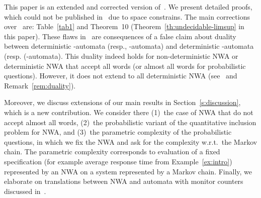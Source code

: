 \documentclass{lmcs}
\begin{document}
\noindent
This paper is an extended and corrected version of~\cite{conferenceVersion,DBLP:conf/sas/ChatterjeeHO16}. We present detailed proofs, which
could not be published in~\cite{conferenceVersion} due to space constrains.
The main corrections over~\cite{conferenceVersion} are: Table~\ref{tab1} and
Theorem~10 (Theorem~\ref{th:undecidable-limsup} in this paper).
These flaws in~\cite{conferenceVersion} are consequences of a false claim about duality
between deterministic -automata (resp., -automata) and deterministic
 -automata (resp. (-automata).
This duality indeed holds for non-deterministic NWA or deterministic NWA that accept all words (or almost all words for
 probabilistic questions).
However, it does not extend to all deterministic NWA (see~\cite{nested} and Remark~\ref{rem:duality}).

Moreover, we discuss extensions of our main results in Section~\ref{s:discussion}, which is a new contribution.
We consider there (1)~the case of NWA that do not accept almost all words, (2)~the probabilistic variant of the quantitative inclusion problem for NWA, and
(3)~the parametric complexity of the probabilistic questions, in which we fix the NWA and ask for the complexity w.r.t.\ the Markov chain.
The parametric complexity corresponds to evaluation of a fixed specification (for example average response time from Example~\ref{ex:intro})
represented by an NWA  on a system represented by a Markov chain.
Finally, we elaborate on translations between NWA and automata with monitor counters discussed in~\cite{conferenceVersion,DBLP:conf/sas/ChatterjeeHO16}.
\end{document}
